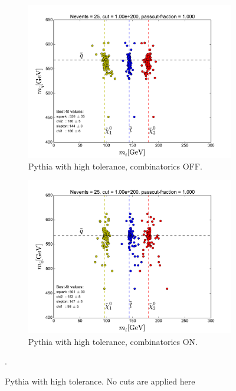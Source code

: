 \documentclass[twoside,english]{uiofysmaster}
\begin{document}
\begin{figure}[hbt]
	\centering
	\begin{subfigure}[b]{0.6\textwidth}
		\includegraphics[width=\textwidth]{figures/making-sense/20150220_pythia_with_FSR_tol-0p1.pdf} 
		\caption{Pythia with high tolerance, combinatorics OFF.}
	\end{subfigure}

	\begin{subfigure}[b]{0.6\textwidth}
		\includegraphics[width=\textwidth]{figures/making-sense/20150220_pythia_with_FSR_combinatorics-ON_tol-0p1.pdf} 
		\caption{Pythia with high tolerance, combinatorics ON.}
	\end{subfigure}
	\label{pythia-high}
	\caption{Pythia with high tolerance. No cuts are applied here}.
\end{figure}
\end{document}
